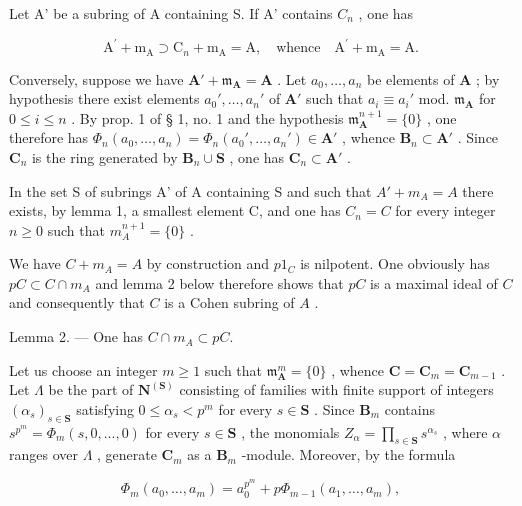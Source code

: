 Let A' be a subring of A containing S. If A' contains \(C_{n}\) , one has

\[
\mathrm{A} ^ {\prime} + \mathrm{m} _ {\mathrm{A}} \supset \mathrm{C} _ {n} + \mathrm{m} _ {\mathrm{A}} = \mathrm{A}, \quad \mathrm{whence} \quad \mathrm{A} ^ {\prime} + \mathrm{m} _ {\mathrm{A}} = \mathrm{A}.
\]

Conversely, suppose we have \(\mathbf{A}' + \mathfrak{m}_{\mathbf{A}} = \mathbf{A}\) . Let \(a_0, \ldots, a_n\) be elements of \(\mathbf{A}\) ; by hypothesis there exist elements \(a_0', \ldots, a_n'\) of \(\mathbf{A}'\) such that \(a_i \equiv a_i'\) mod. \(\mathfrak{m}_{\mathbf{A}}\) for \(0 \leqslant i \leqslant n\) . By prop. 1 of § 1, no. 1 and the hypothesis \(\mathfrak{m}_{\mathbf{A}}^{n+1} = \{0\}\) , one therefore has \(\Phi_n(a_0, \ldots, a_n) = \Phi_n(a_0', \ldots, a_n') \in \mathbf{A}'\) , whence \(\mathbf{B}_n \subset \mathbf{A}'\) . Since \(\mathbf{C}_n\) is the ring generated by \(\mathbf{B}_n \cup \mathbf{S}\) , one has \(\mathbf{C}_n \subset \mathbf{A}'\) .

In the set S of subrings A' of A containing S and such that \(A' + m_{A} = A\) there exists, by lemma 1, a smallest element C, and one has \(C_{n} = C\) for every integer \(n \geqslant 0\) such that \(m_{A}^{n+1} = \{0\}\) .

We have \(C + m_A = A\) by construction and \(p1_C\) is nilpotent. One obviously has \(pC \subset C \cap m_A\) and lemma 2 below therefore shows that \(pC\) is a maximal ideal of \(C\) and consequently that \(C\) is a Cohen subring of \(A\) .

Lemma 2. --- One has \(C \cap m_{A} \subset pC\).

Let us choose an integer \(m \geqslant 1\) such that \(\mathfrak{m}_{\mathbf{A}}^{m} = \{0\}\) , whence \(\mathbf{C} = \mathbf{C}_{m} = \mathbf{C}_{m-1}\) . Let \(\Lambda\) be the part of \(\mathbf{N}^{(\mathbf{S})}\) consisting of families with finite support of integers \((\alpha_{s})_{s \in \mathbf{S}}\) satisfying \(0 \leqslant \alpha_{s} < p^{m}\) for every \(s \in \mathbf{S}\) . Since \(\mathbf{B}_{m}\) contains \(s^{p^{m}} = \Phi_{m}(s, 0, ..., 0)\) for every \(s \in \mathbf{S}\) , the monomials \(Z_{\alpha} = \prod_{s \in \mathbf{S}} s^{\alpha_{s}}\) , where \(\alpha\) ranges over \(\Lambda\) , generate \(\mathbf{C}_{m}\) as a \(\mathbf{B}_{m}\) -module. Moreover, by the formula

\[
\Phi_ {m} (a _ {0}, \dots , a _ {m}) = a _ {0} ^ {p ^ {m}} + p \Phi_ {m - 1} (a _ {1}, \dots , a _ {m}),
\]

